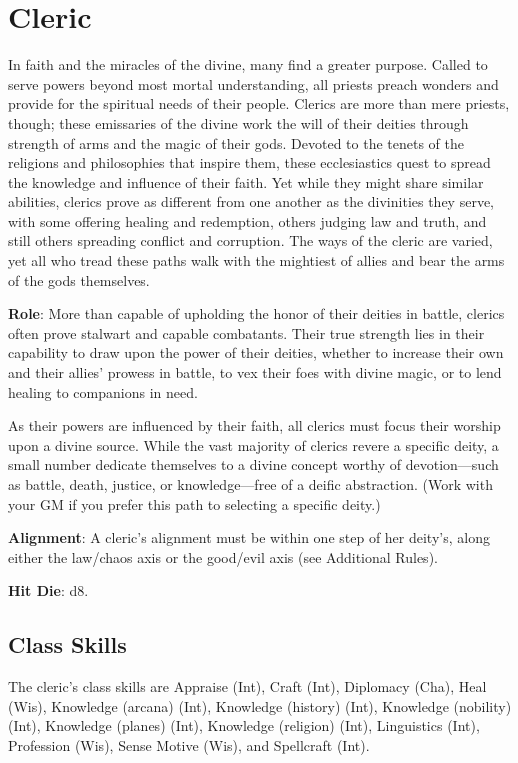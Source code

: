 \section{Cleric}

\label{f0}				
In faith and the miracles of the divine, many find a greater purpose. Called to serve powers beyond most mortal understanding, all priests preach wonders and provide for the spiritual needs of their people. Clerics are more than mere priests, though; these emissaries of the divine work the will of their deities through strength of arms and the magic of their gods. Devoted to the tenets of the religions and philosophies that inspire them, these ecclesiastics quest to spread the knowledge and influence of their faith. Yet while they might share similar abilities, clerics prove as different from one another as the divinities they serve, with some offering healing and redemption, others judging law and truth, and still others spreading conflict and corruption. The ways of the cleric are varied, yet all who tread these paths walk with the mightiest of allies and bear the arms of the gods themselves.
				
\textbf{Role}: More than capable of upholding the honor of their deities in battle, clerics often prove stalwart and capable combatants. Their true strength lies in their capability to draw upon the power of their deities, whether to increase their own and their allies' prowess in battle, to vex their foes with divine magic, or to lend healing to companions in need.
				
As their powers are influenced by their faith, all clerics must focus their worship upon a divine source. While the vast majority of clerics revere a specific deity, a small number dedicate themselves to a divine concept worthy of devotion---such as battle, death, justice, or knowledge---free of a deific abstraction. (Work with your GM if you prefer this path to selecting a specific deity.)
				
\textbf{Alignment}: A cleric's alignment must be within one step of her deity's, along either the law/chaos axis or the good/evil axis (see Additional Rules).
				
\textbf{Hit Die}: d8.
				
\subsection{Class Skills}

				
The cleric's class skills are Appraise (Int), Craft (Int), Diplomacy (Cha), Heal (Wis), Knowledge (arcana) (Int), Knowledge (history) (Int), Knowledge (nobility) (Int), Knowledge (planes) (Int), Knowledge (religion) (Int), Linguistics (Int), Profession (Wis), Sense Motive (Wis), and Spellcraft (Int).
				
